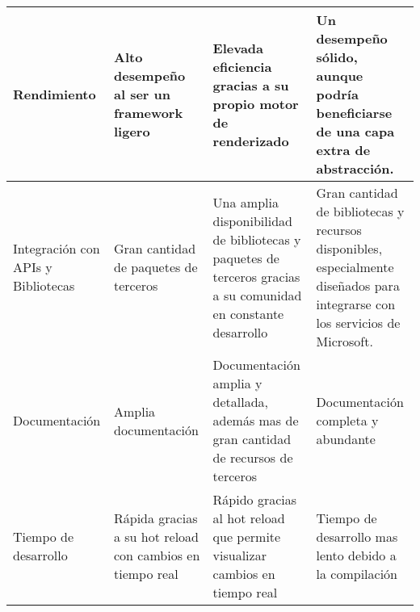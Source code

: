 \begin{longtable}{|p{3cm}|p{3cm}|p{3cm}|p{3cm}|}
    Rendimiento                                    & Alto desempeño al ser un framework ligero                 & Elevada eficiencia gracias a su propio motor de renderizado                                                    & Un desempeño sólido, aunque podría beneficiarse de una capa extra de abstracción.                                            \\\hline
    Integración con APIs y Bibliotecas             & Gran cantidad de paquetes de terceros                     & Una amplia disponibilidad de bibliotecas y paquetes de terceros gracias a su comunidad en constante desarrollo & Gran cantidad de bibliotecas y recursos disponibles, especialmente diseñados para integrarse con los servicios de Microsoft. \\\hline
    Documentación                                  & Amplia documentación                                      & Documentación amplia y detallada, además  mas de gran cantidad de recursos de terceros                         & Documentación completa y abundante                                                                                           \\\hline
    Tiempo de desarrollo                           & Rápida gracias a su hot reload con cambios en tiempo real & Rápido gracias al hot reload que permite visualizar cambios en tiempo real                                     & Tiempo de desarrollo mas lento debido a la compilación                                                                       \\
\end{longtable}